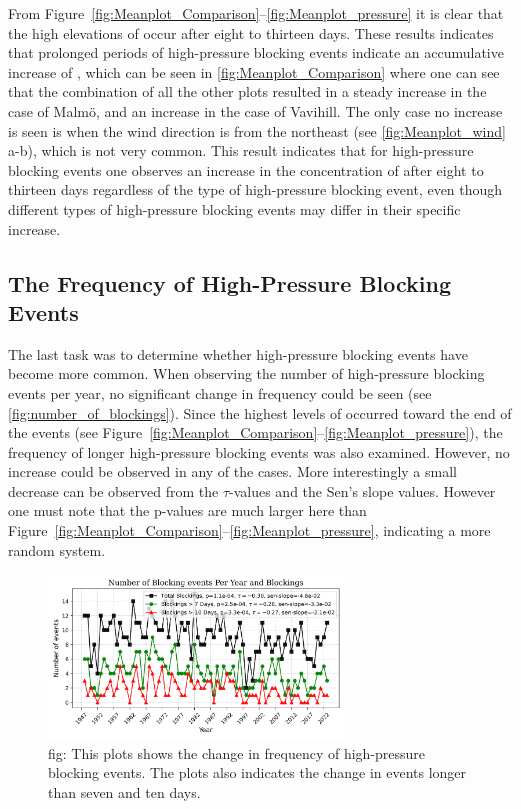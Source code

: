 From Figure~\ref{fig:Meanplot_Comparison}--\ref{fig:Meanplot_pressure} it is clear that the high elevations of \PM occur after eight to thirteen days. These results indicates that prolonged periods of high-pressure blocking events indicate an accumulative increase of \PM, which can be seen in \autoref{fig:Meanplot_Comparison} where one can see that the combination of all the other plots resulted in a steady increase in the case of Malmö, and an increase in the case of Vavihill. The only case no increase is seen is when the wind direction is from the northeast (see \autoref{fig:Meanplot_wind} a-b), which is not very common. This result indicates that for high-pressure blocking events one observes an increase in the concentration of \PM after eight to thirteen days regardless of the type of high-pressure blocking event, even though different types of high-pressure blocking events may differ in their specific increase.

\subsection{The Frequency of High-Pressure Blocking Events}
The last task was to determine whether high-pressure blocking events have become more common. When observing the number of high-pressure blocking events per year, no significant change in frequency could be seen (see \autoref{fig:number_of_blockings}). Since the highest levels of \PM  occurred toward the end of the events (see Figure~\ref{fig:Meanplot_Comparison}--\ref{fig:Meanplot_pressure}), the frequency of longer high-pressure blocking events was also examined. However, no increase could be observed in any of the cases. More interestingly a small decrease can be observed from the $\tau$-values and the Sen's slope values. However one must note that the p-values are much larger here than Figure~\ref{fig:Meanplot_Comparison}--\ref{fig:Meanplot_pressure}, indicating a more random system. 

\begin{figure}[H]
    \centering
    \includegraphics[width=0.7\textwidth]{Figures/BlockingsPerYear.png}
    \caption{fig: This plots shows the change in frequency of high-pressure blocking events. The plots also indicates the change in events longer than seven and ten days. }
    \label{fig:number_of_blockings}
\end{figure}

